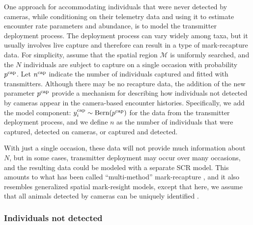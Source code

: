 \documentclass[12pt]{article}
\begin{document}
One approach for accommodating individuals that were never detected by
cameras, while conditioning on their telemetry data and using it to
estimate encounter rate parameters and abundance, is to model the
transmitter deployment process. The deployment process
can vary widely among taxa, but it usually involves live capture
and therefore can result in a type of mark-recapture
data. For simplicity, assume that the spatial region $\mathcal{M}$ is
uniformly searched, and the $N$ individuals are subject to capture on
a single occasion with probability $p^{\rm cap}$. Let $n^{\rm cap}$ indicate
the number of individuals captured and fitted with
transmitters. Although there may be no recapture data, %
the addition of the new parameter $p^{\rm cap}$ provide a mechanism
for describing how individuals not detected by cameras appear in
the camera-based encounter histories. Specifically, %
we add the model component: 
$y^{\rm cap}_i \sim \mathrm{Bern}(p^{\rm cap})$ for the data from the
transmitter deployment process, and we define $n$ as the number of
individuals that were captured, detected on cameras, or captured and
detected. 

With just a single occasion, these
data will not provide much information about $N$, but in some cases,
transmitter deployment may occur over many occasions, and the
resulting data could be modeled with a separate SCR model. This
amounts to what has been called ``multi-method'' mark-recapture
\citep{tourani_etal:2020}, and it also resembles generalized spatial
mark-resight models, except that here, we assume that all animals
detected by cameras can be uniquely identified
\citep{efford_hunter:2018,whittington_etal:2018}. 

\subsubsection{Individuals not detected}
\label{ssec:n0}
\end{document}
